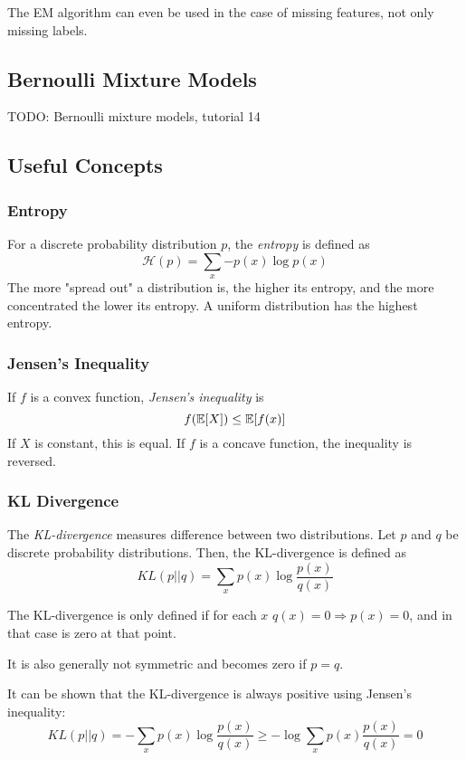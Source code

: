 The EM algorithm can even be used in
the case of missing features,
not only missing labels.


\subsection{Bernoulli Mixture Models}
TODO: Bernoulli mixture models, tutorial 14


\subsection{Useful Concepts}
\subsubsection{Entropy}
For a discrete probability distribution $p$,
the \emph{entropy} is defined as
\begin{equation*}
\mathcal{H}(p) = \sum_x{-p(x) \log{p(x)}}
\end{equation*}
The more "spread out" a distribution is,
the higher its entropy,
and the more concentrated the lower its entropy.
A uniform distribution has the highest entropy.

\subsubsection{Jensen’s Inequality}
If $f$ is a convex function, \emph{Jensen's inequality} is
\begin{equation*}
f(\mathbb{E}[X]) \leq \mathbb{E}[f(x)]
\end{equation*}
If $X$ is constant, this is equal.
If $f$ is a concave function,
the inequality is reversed.

\subsubsection{KL Divergence}
The \emph{KL-divergence} measures difference between
two distributions.
Let $p$ and $q$ be discrete probability distributions.
Then, the KL-divergence is defined as
\begin{equation*}
KL(p || q) = \sum_x{p(x) \log{\frac{p(x)}{q(x)}}}
\end{equation*}

The KL-divergence is only defined if
for each $x$ $q(x) = 0 \Rightarrow p(x) = 0$,
and in that case is zero at that point.

It is also generally not symmetric
and becomes zero if $p = q$.

It can be shown that the KL-divergence is
always positive using Jensen's inequality:
\begin{equation*}
KL(p || q) = -\sum_x{p(x) \log{\frac{p(x)}{q(x)}}} \geq - \log{
	\sum_x{p(x) \frac{p(x)}{q(x)}}
} = 0
\end{equation*}


